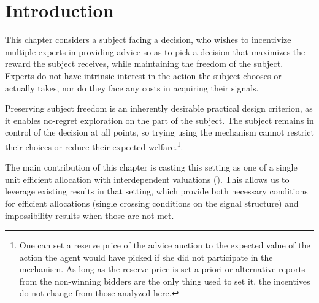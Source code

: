 
\section{Introduction}



This chapter considers a subject facing a decision, who wishes to incentivize multiple experts in providing advice so as to pick a decision that maximizes the reward the subject receives, while maintaining the freedom of the subject.
Experts do not have intrinsic interest in the action the subject chooses or actually takes, nor do they face any costs in acquiring their signals.

Preserving subject freedom is an inherently desirable practical design criterion, as it enables no-regret exploration on the part of the subject. The subject remains in control of the decision at all points, so trying using the mechanism cannot restrict their choices or reduce their expected welfare.\footnote{One can set a reserve price of the advice auction to the expected value of the action the agent would have picked if she did not participate in the mechanism. As long as the reserve price is set a priori or alternative reports from the non-winning bidders are the only thing used to set it, the incentives do not change from those analyzed here.}.



The main contribution of this chapter is casting this setting as one of a single unit efficient allocation with interdependent valuations (\cite{milgrom1982theory,maskin1992auctions,ausubel1999generalized,mclean2004informational,roughgarden2016optimal,eden2018interdependent}).
This allows us to leverage existing results in that setting, which provide both necessary conditions for efficient allocations (single crossing conditions on the signal structure) and impossibility results when those are not met.

